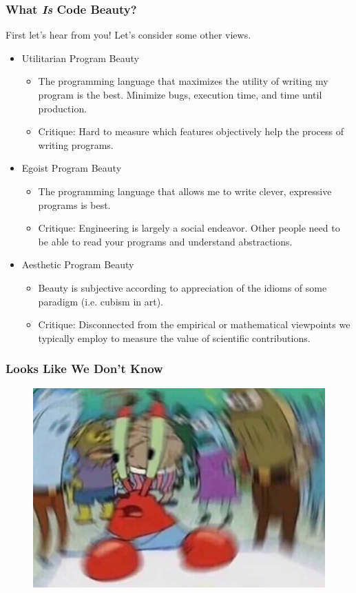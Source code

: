 \documentclass{beamer}
\begin{document}
\begin{frame}
  \frametitle{What \emph{Is} Code Beauty?}
  First let's hear from you!
  \pause
  Let's consider some other views.
  \begin{itemize}
  \item<2-> Utilitarian Program Beauty 
    \begin{itemize}
    \item<3-> The programming language that maximizes the utility of writing my program is the best. Minimize bugs, execution time, and time until production.
    \item<4-> Critique: Hard to measure which features objectively help the process of writing programs.
    \end{itemize}
  \item<5-> Egoist Program Beauty 
    \begin{itemize}
    \item<6-> The programming language that allows me to write clever, expressive programs is best. 
    \item<7-> Critique: Engineering is largely a social endeavor. Other people need to be able to read your programs and understand abstractions.
    \end{itemize}
  \item<8-> Aesthetic Program Beauty 
    \begin{itemize}
    \item<9-> Beauty is subjective according to appreciation of the idioms of some paradigm (i.e. cubism in art).
    \item<10-> Critique: Disconnected from the empirical or mathematical viewpoints we typically employ to measure the value of scientific contributions. 
    \end{itemize}
  \end{itemize}
\end{frame}

\begin{frame}
  \frametitle{Looks Like We Don't Know}
  \begin{figure}
    \centering
    \includegraphics[width=.7\textwidth]{images/mr-krabs.jpeg}
  \end{figure}
\end{frame}
\end{document}
